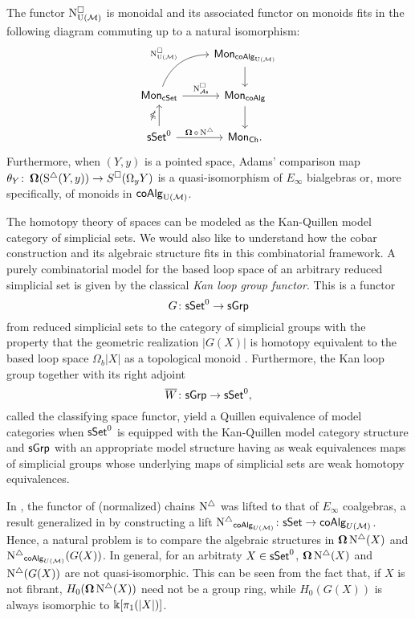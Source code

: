 \begin{theorem} \label{t:1st main thm in the intro}
	The functor $\operatorname{N^{\square}_{{\mathrm{U}(\mathcal{M})}}}$ is monoidal and its associated functor on monoids fits in the following diagram commuting up to a natural isomorphism:
	\begin{equation*}
	\begin{tikzcd}
	& \Mon_{\coAlg_\UM} \arrow[d] \\
	\Mon_{\cSet} \arrow[ru, "\cchainsUM", out=70, in=180] \arrow[r, "\cchainsAS"]
	& \Mon_{\coAlg} \arrow[d] \\
	\sSet^0 \arrow[r, "\cobar \circ \schains"] \arrow[u, "\gcobar"]
	& \Mon_{\Ch}.
	\end{tikzcd}
	\end{equation*}
	Furthermore, when $(Y, y)$ is a pointed space, Adams' comparison map $\theta_Y \colon \operatorname{\mathbf{\Omega}}(\operatorname{S^{\triangle}}(Y, y)) \to S^{\square}(\Omega_y Y)$ is a quasi-isomorphism of $E_\infty$ bialgebras or, more specifically, of monoids in $\mathsf{coAlg}_{\mathrm{U}(\mathcal{M})}$.
\end{theorem} 


The homotopy theory of spaces can be modeled as the Kan-Quillen model category of simplicial sets. We would also like to understand how the cobar construction and its algebraic structure fits in this combinatorial framework. A purely combinatorial model for the based loop space of an arbitrary reduced simplicial set is given by the classical \textit{Kan loop group functor}.
This is a functor 
$$G\colon \mathsf{sSet}^0 \to \mathsf{sGrp}$$
from reduced simplicial sets to the category of simplicial groups with the property that the geometric realization $|G(X)|$ is homotopy equivalent to the based loop space $\Omega_b|X|$ as a topological monoid \cite{berger1995loops}. Furthermore, the Kan loop group together with its right adjoint $$\overline{W} \colon  \mathsf{sGrp} \to \mathsf{sSet}^0,$$ called the classifying space functor, yield a Quillen equivalence of model categories when $\mathsf{sSet}^0$ is equipped with the Kan-Quillen model category structure and $\mathsf{sGrp}$ with an appropriate model structure having as weak equivalences maps of simplicial groups whose underlying maps of simplicial sets are weak homotopy equivalences. 

In \cite{mcclure2003multivariable, berger2004combinatorial}, the functor of (normalized) chains $\operatorname{N^{\triangle}}$ was lifted to that of $E_\infty$ coalgebras, a result generalized in \cite{medina2020prop1} by constructing a lift $\operatorname{N^{\triangle}}_{\mathsf{coAlg}_{U(\mathcal{M})}} \colon \mathsf{sSet} \to \mathsf{coAlg}_{U(\mathcal{M})}$. Hence, a natural problem is to compare the algebraic structures in $\operatorname{\mathbf{\Omega}} \operatorname{N^{\triangle}}(X)$ and $\operatorname{N^{\triangle}}_{\mathsf{coAlg}_{U(\mathcal{M})}}(G(X))$. In general, for an arbitraty $X \in \mathsf{sSet}^0$, $\operatorname{\mathbf{\Omega}} \operatorname{N^{\triangle}}(X)$ and $\operatorname{N^{\triangle}}(G(X))$ are not quasi-isomorphic.
This can be seen from the fact that, if $X$ is not fibrant, $H_0(\operatorname{\mathbf{\Omega}} \operatorname{N^{\triangle}}(X))$ need not be a group ring, while $H_0(G(X))$ is always isomorphic to $ \Bbbk[\pi_1(|X|)]$.

